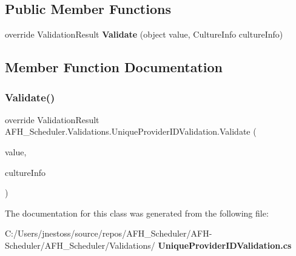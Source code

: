 \subsection*{Public Member Functions}
\begin{DoxyCompactItemize}
\item 
override Validation\+Result \textbf{ Validate} (object value, Culture\+Info culture\+Info)
\end{DoxyCompactItemize}


\subsection{Member Function Documentation}
\mbox{\label{class_a_f_h___scheduler_1_1_validations_1_1_unique_provider_i_d_validation_af92fdbfc2c1088fc3dffddd0ae3140b6}} 
\subsubsection{Validate()}
{\footnotesize\ttfamily override Validation\+Result A\+F\+H\+\_\+\+Scheduler.\+Validations.\+Unique\+Provider\+I\+D\+Validation.\+Validate (\begin{DoxyParamCaption}\item[{object}]{value,  }\item[{Culture\+Info}]{culture\+Info }\end{DoxyParamCaption})}



The documentation for this class was generated from the following file\+:\begin{DoxyCompactItemize}
\item 
C\+:/\+Users/jnestoss/source/repos/\+A\+F\+H\+\_\+\+Scheduler/\+A\+F\+H-\/\+Scheduler/\+A\+F\+H\+\_\+\+Scheduler/\+Validations/\textbf{ Unique\+Provider\+I\+D\+Validation.\+cs}\end{DoxyCompactItemize}
